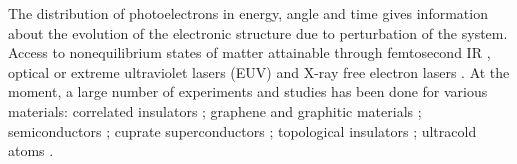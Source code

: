 The distribution of photoelectrons in energy, angle and time gives information about the evolution of the electronic structure due to perturbation of the system. 
Access to nonequilibrium states of matter attainable through femtosecond IR \citep{C9CP00855A, PhysRevApplied.3.051002}, optical \citep{Steinmeyer1507, Hentschel_2001} or extreme ultraviolet lasers (EUV) and X-ray free
electron lasers \citep{McNeil_2010,Dunne_Mike_2018,Parra2003,Maltezopoulos_2008}.
At the moment, a large number of experiments and studies has been done for various materials: correlated insulators \citep{PhysRevLett.112.087402,PhysRevB.89.205114,PhysRevLett.113.216401}; graphene \citep{Nature_Materials_12_1119_1124,doi:10.1063/1.4871381} and graphitic materials \citep{PhysRevLett.76.483,PhysRevLett.87.267402,PhysRevLett.112.257401,PhysRevB.92.184303}; semiconductors \citep{RevModPhys.83.543,PhysRevB.81.113203}; cuprate superconductors \citep{PhysRevLett.99.197001,PhysRevLett.107.097002,Smallwood1137,Sci_Rep_6_18747_2016}; topological insulators \citep{Wang453,Sci_Rep_5_13213_2015,PhysRevLett.108.117403,PhysRevLett.109.127401,Nat_Commun_5_3003_2014,Sci_Rep_5_8160_2015,PhysRevLett.115.116801}; ultracold atoms \citep{PhysRevA.50.5025,PhysRevA.64.033421,PhysRevA.80.033404,}.



